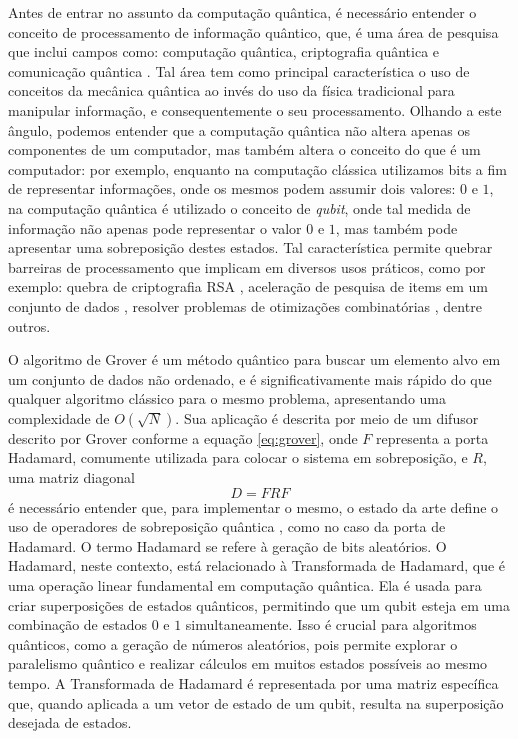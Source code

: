 \documentclass[12pt]{article}
\begin{document}
Antes de entrar no assunto da computação quântica, é necessário entender o conceito de processamento de informação quântico, que, é uma área de pesquisa que inclui campos como: computação quântica, criptografia quântica e comunicação quântica \cite{rieffel/11}. Tal área tem como principal característica o uso de conceitos da mecânica quântica ao invés do uso da física tradicional para manipular informação, e consequentemente o seu processamento.
Olhando a este ângulo, podemos entender que a computação quântica não altera apenas os componentes de um computador, mas também altera o conceito do que é um computador: por exemplo, enquanto na computação clássica utilizamos bits a fim de representar informações, onde os mesmos podem assumir dois valores: $0$ e $1$, na computação quântica é utilizado o conceito de \textit{qubit}, onde tal medida de informação não apenas pode representar o valor $0$ e $1$, mas também pode apresentar uma sobreposição destes estados. Tal característica permite quebrar barreiras de processamento que implicam em diversos usos práticos, como por exemplo: quebra de criptografia RSA \cite{shor:06}, aceleração de pesquisa de items em um conjunto de dados \cite{grover:96}, resolver problemas de otimizações combinatórias \cite{farhi:2014}, dentre outros.

O algoritmo de Grover \cite{grover:96} é um método quântico para buscar um elemento alvo em um conjunto de dados não ordenado, e é significativamente mais rápido do que qualquer algoritmo clássico para o mesmo problema, apresentando uma complexidade de $O(\sqrt{N})$. Sua aplicação é descrita por meio de um difusor descrito por Grover conforme a equação
\ref{eq:grover}, onde $F$ representa a porta Hadamard, comumente utilizada para colocar o sistema em sobreposição, e $R$, uma matriz diagonal
\begin{equation}
D = FRF \label{eq:grover}
\end{equation}
é necessário entender que, para implementar o mesmo, o estado da arte define o uso de operadores de sobreposição quântica , como no caso da porta de Hadamard.\cite{silva:18} O termo Hadamard se refere à geração de bits aleatórios. O Hadamard, neste contexto, está relacionado à Transformada de Hadamard, que é uma operação linear fundamental em computação quântica. Ela é usada para criar superposições de estados quânticos, permitindo que um qubit esteja em uma combinação de estados $0$ e $1$ simultaneamente. Isso é crucial para algoritmos quânticos, como a geração de números aleatórios, pois permite explorar o paralelismo quântico e realizar cálculos em muitos estados possíveis ao mesmo tempo. A Transformada de Hadamard é representada por uma matriz específica que, quando aplicada a um vetor de estado de um qubit, resulta na superposição desejada de estados.
\end{document}
